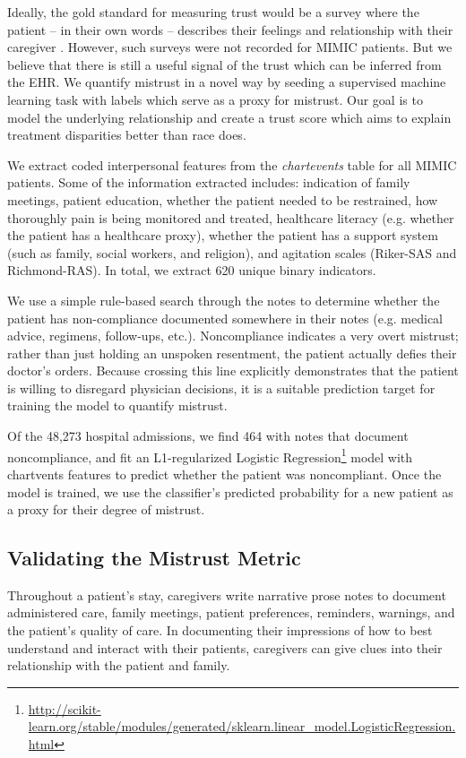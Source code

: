 \documentclass{article}
\begin{document}
Ideally, the gold standard for measuring trust would be a survey where the patient -- in their own words -- describes their feelings and relationship with their caregiver \citep{trust-improves-outcomes}. However, such surveys were not recorded for MIMIC patients. But we believe that there is still a useful signal of the trust which can be inferred from the EHR. We quantify mistrust in a novel way by seeding a supervised machine learning task with labels which serve as a proxy for mistrust.
Our goal is to model the underlying relationship and create a trust score which aims to explain treatment disparities better than race does.

We extract coded interpersonal features from the \textit{chartevents} table for all MIMIC patients.
Some of the information extracted includes: indication of family meetings, patient education, whether the patient needed to be restrained, how thoroughly pain is being monitored and treated, healthcare literacy (e.g. whether the patient has a healthcare proxy), whether the patient has a support system (such as family, social workers, and religion), and agitation scales (Riker-SAS and Richmond-RAS). In total, we extract 620 unique binary indicators.

We use a simple rule-based search through the notes to determine
whether the patient has non-compliance documented somewhere in their notes (e.g. medical advice, regimens, follow-ups, etc.).
Noncompliance indicates a very overt mistrust; rather than just holding an unspoken resentment, the patient actually defies their doctor's orders. Because crossing this line explicitly demonstrates that the patient is willing to disregard physician decisions, it is a suitable prediction target for training the model to quantify mistrust. 

Of the 48,273 hospital admissions, we find 464 with notes that document noncompliance, and fit an L1-regularized Logistic Regression\footnote{\url{http://scikit-learn.org/stable/modules/generated/sklearn.linear_model.LogisticRegression.html}} model with chartvents features to predict whether the patient was noncompliant. Once the model is trained, we use the classifier's predicted probability for a new patient as a proxy for their degree of mistrust. 


\subsection{Validating the Mistrust Metric}

Throughout a patient's stay, caregivers write narrative prose notes to document administered care, family meetings, patient preferences, reminders, warnings, and the patient's quality of care. 
In documenting their impressions of how to best understand and interact with their patients, caregivers can give clues into their relationship with the patient and family. 
\end{document}
